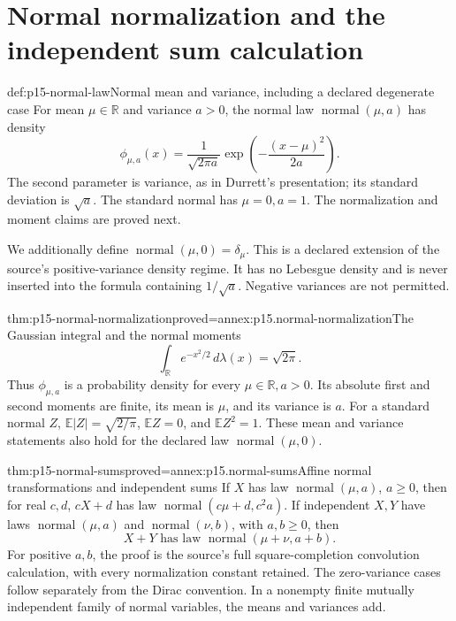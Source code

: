 \section{Normal normalization and the independent sum calculation}
\label{sec:p15-normal-convolution}

\begin{hbdefinition}{def:p15-normal-law}{Normal mean and variance, including a declared degenerate case}
For mean \(\mu\in\mathbb R\) and variance \(a>0\), the normal law
\(\operatorname{normal}(\mu,a)\) has density
\[
 \phi_{\mu,a}(x)=\frac1{\sqrt{2\pi a}}
                  \exp\left(-\frac{(x-\mu)^2}{2a}\right).
\]
The second parameter is variance, as in Durrett's presentation; its
standard deviation is \(\sqrt a\). The standard normal has
\(\mu=0,a=1\). The normalization and moment claims are proved next.

We additionally define \(\operatorname{normal}(\mu,0)=\delta_\mu\).
This is a declared extension of the source's positive-variance density
regime. It has no Lebesgue density and is never inserted into the formula
containing \(1/\sqrt a\). Negative variances are not permitted.
\end{hbdefinition}

\begin{hbtheorem}{thm:p15-normal-normalization}{proved=annex:p15.normal-normalization}{The Gaussian integral and the normal moments}
\[
 \int_{\mathbb R}e^{-x^2/2}\,d\lambda(x)=\sqrt{2\pi}.
\]
Thus \(\phi_{\mu,a}\) is a probability density for every
\(\mu\in\mathbb R,a>0\). Its absolute first and second moments
are finite, its mean is \(\mu\), and its variance is \(a\).
For a standard normal \(Z\), \(\mathbb E|Z|=\sqrt{2/\pi}\),
\(\mathbb E Z=0\), and \(\mathbb E Z^2=1\).
These mean and variance statements also hold for the declared law
\(\operatorname{normal}(\mu,0)\).
\end{hbtheorem}

\begin{hbtheorem}{thm:p15-normal-sums}{proved=annex:p15.normal-sums}{Affine normal transformations and independent sums}
If \(X\) has law \(\operatorname{normal}(\mu,a)\), \(a\geq0\),
then for real \(c,d\), \(cX+d\) has law
\(\operatorname{normal}(c\mu+d,c^2a)\).
If independent \(X,Y\) have laws
\(\operatorname{normal}(\mu,a)\) and
\(\operatorname{normal}(\nu,b)\), with \(a,b\geq0\), then
\[
 X+Y\text{ has law }\operatorname{normal}(\mu+\nu,a+b).
\]
For positive \(a,b\), the proof is the source's full square-completion
convolution calculation, with every normalization constant retained.
The zero-variance cases follow separately from the Dirac convention.
In a nonempty finite mutually independent family of normal variables, the means
and variances add.
\end{hbtheorem}

